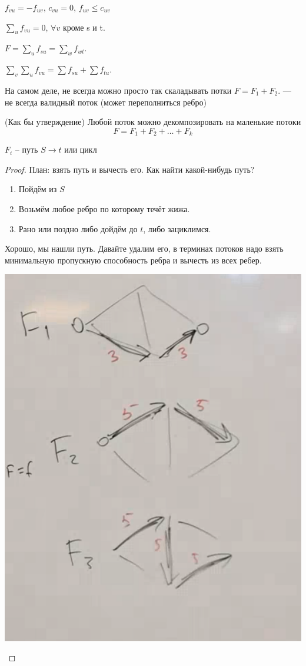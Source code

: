 $f_{vu} = - f_{uv}$, $c_{vu} = 0$, $f_{uv} \leqslant c_{uv}$

$\sum_u f_{vu} = 0$, $\forall v$ кроме s и t.

$F = \sum_u f_{su} = \sum_w f_{wt}$.

$\sum_v \sum_u f_{vu} = \sum f_{su} + \sum f_{tu}$.

На самом деле, не всегда можно просто так скаладывать потки $F = F_1 + F_2$. --- не всегда валидный поток (может переполниться ребро)

\begin{theorem} (Как бы утверждение)
    Любой поток можно декомпозировать на маленькие потоки
    \[F = F_1 + F_2 + \ldots + F_k\]

    $F_i$ -- путь $S \rightarrow t$ или цикл
\end{theorem}
\begin{proof}
    План: взять путь и вычесть его. Как найти какой-нибудь путь?

    \begin{enumerate}
        \item Пойдём из $S$
        \item Возьмём любое ребро по которому течёт жижа. 
        \item Рано или поздно либо дойдём до $t$, либо зациклимся.
    \end{enumerate}

    Хорошо, мы нашли путь. Давайте удалим его, в терминах потоков надо взять минимальную пропускную способность ребра и вычесть из всех ребер. 

    \begin{center}
        \includegraphics[scale=0.5]{img/flows_splitting.png}
    \end{center}


\end{proof}
